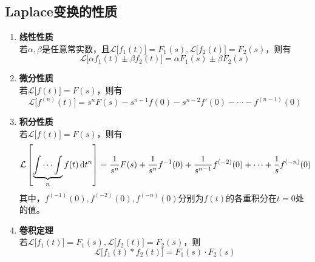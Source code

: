 

\subsection{Laplace变换的性质}

\begin{enumerate}[\textbf{性质} 1 ]
	\item \textbf{线性性质}\\
	若$\alpha,\beta$是任意常实数，且$\mathcal{L}\big[f_1(t)\big] = F_1(s), \mathcal{L}\big[f_2(t)\big] = F_2(s)$，则有
	\begin{equation}
		\mathcal{L}\big[\alpha f_1(t)\pm \beta f_2(t)\big] = \alpha F_1(s) \pm \beta F_2(s)
	\end{equation}
	
	\item \textbf{微分性质}\\
	若$\mathcal{L}\big[f(t)\big] = F(s)$，则有
	\begin{equation}
		\mathcal{L}\big[f^{(n)}(t)\big] = s^nF(s) -s^{n-1}f(0)-s^{n-2}f'(0)- \cdots - f^{(n-1)}(0)
	\end{equation}
	
	\item \textbf{积分性质}\\
	若$\mathcal{L}\big[f(t)\big] = F(s)$，则有
	\begin{equation}
		\mathcal{L}\left[\underbrace{\int\cdots\int}_{n} f(t) \,{\rm{d}} t^n\right]=\frac{1}{s^n}F(s)+\frac{1}{s^n}f^{-1}(0) +\frac{1}{s^{n-1}}f^{(-2)}(0)+\cdots +\frac{1}{s}f^{(-n)}(0)
	\end{equation}
	其中，$f^{(-1)}(0),f^{(-2)}(0),f^{(-n)}(0)$分别为$f(t)$的各重积分在$t=0$处的值。\\
	
	\item \textbf{卷积定理}\\
	若$\mathcal{L}\big[f_1(t)\big] = F_1(s), \mathcal{L}\big[f_2(t)\big] = F_2(s)$，则
	\begin{equation}
		\mathcal{L}\big[f_1(t) * f_2(t)\big] = F_1(s) \cdot F_2(s)
	\end{equation}
\end{enumerate}
\warn[
Laplace变换的重要条件：\vspace*{-0.5em}
{
	\begin{enumerate}
		\item $t<0$时，$f(t)=0$；$t > 0$时，$f(t)$是分段光滑的。\vspace*{-0.5em}
		\item $f(t)$有\textcolor{red}{有限的增长指数}。即存在正数$M$及$c \ge 0$，使得对于任何$t$值，$|f(t)| \le M\e^{ct}$，则Laplace变换在$\text{Re} (p)= \beta >c$时存在。
	\end{enumerate}
}
]

